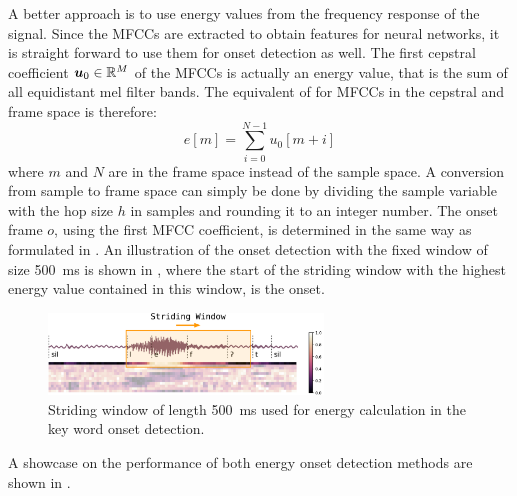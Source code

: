 A better approach is to use energy values from the frequency response of the signal.
Since the MFCCs are extracted to obtain features for neural networks, it is straight forward to use them for onset detection as well.
The first cepstral coefficient $\bm{u}_0 \in \mathbb{R}^M$ of the MFCCs is actually an energy value, that is the sum of all equidistant mel filter bands.
The equivalent of  for MFCCs in the cepstral and frame space is therefore:
\begin{equation}
  e[m] = \sum_{i=0}^{N-1} u_0[m + i]
\end{equation}
where $m$ and $N$ are in the frame space instead of the sample space.
A conversion from sample to frame space can simply be done by dividing the sample variable with the hop size $h$ in samples and rounding it to an integer number.
The onset frame $o$, using the first MFCC coefficient, is determined in the same way as formulated in .
An illustration of the onset detection with the fixed window of size \SI{500}{\milli\second} is shown in , where
the start of the striding window with the highest energy value contained in this window, is the onset.
\begin{figure}[!ht]
  \centering
    \includegraphics[width=0.65\textwidth]{./3_signal/figs/signal_onset_window}
  \caption{Striding window of length \SI{500}{\milli\second} used for energy calculation in the key word onset detection.}
  \label{fig:signal_onset_window}
\end{figure}
\FloatBarrier
\noindent
A showcase on the performance of both energy onset detection methods are shown in .
